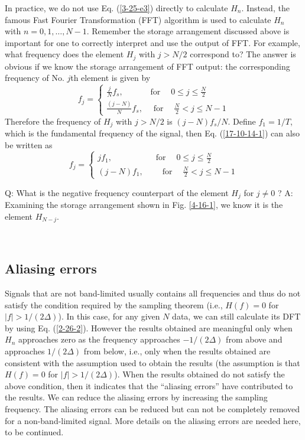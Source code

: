 \documentclass{article}
\newcommand{\tmop}[1]{\ensuremath{\operatorname{#1}}}
\begin{document}
In practice, we do not use Eq. (\ref{3-25-e3}) directly to calculate $H_n$.
Instead, the famous Fast Fourier Transformation (FFT) algorithm is used to
calculate $H_n$ with $n = 0, 1, \ldots, N - 1$. Remember the storage
arrangement discussed above is important for one to correctly interpret and
use the output of FFT. For example, what frequency does the element $H_j$ with
$j > N / 2$ correspond to? The answer is obvious if we know the storage
arrangement of FFT output: the corresponding frequency of No. $j$th element is
given by
\begin{equation}
  \label{17-10-14-1} f_j = \left\{ \begin{array}{l}
    \frac{j}{N} f_s, \hspace{3em} \tmop{for} \quad 0 \leqslant j \leqslant
    \frac{N}{2}\\
    \frac{(j - N)}{N} f_s, \quad \tmop{for} \quad  \frac{N}{2} < j \leqslant N
    - 1
  \end{array} \right.
\end{equation}
Therefore the frequency of $H_j$ with $j > N / 2$ is $(j - N) f_s / N$. Define
$f_1 = 1 / T$, which is the fundamental frequency of the signal, then Eq.
(\ref{17-10-14-1}) can also be written as
\begin{equation}
  f_j = \left\{ \begin{array}{l}
    j f_1, \hspace{5em} \tmop{for} \quad 0 \leqslant j \leqslant \frac{N}{2}\\
    (j - N) f_1, \qquad \tmop{for} \quad  \frac{N}{2} < j \leqslant N - 1
  \end{array} \right.
\end{equation}


Q: What is the negative frequency counterpart of the element $H_j$ for $j \neq
0$ ? A: Examining the storage arrangement shown in Fig. \ref{4-16-1}, we know
it is the element $H_{N - j}$.

\

\subsection{Aliasing errors}

Signals that are not band-limited usually contains all frequencies and thus do
not satisfy the condition required by the sampling theorem (i.e., $H (f) = 0$
for $|f| > 1 / (2 \Delta)$). In this case, for any given $N$ data, we can
still calculate its DFT by using Eq. (\ref{2-26-2}). However the results
obtained are meaningful only when $H_n$ approaches zero as the frequency
approaches $- 1 / (2 \Delta)$ from above and approaches $1 / (2 \Delta)$ from
below, i.e., only when the results obtained are consistent with the assumption
used to obtain the results (the assumption is that $H (f) = 0$ for $|f| > 1 /
(2 \Delta)$). When the results obtained do not satisfy the above condition,
then it indicates that the ``aliasing errors'' have contributed to the
results. We can reduce the aliasing errors by increasing the sampling
frequency. The aliasing errors can be reduced but can not be completely
removed for a non-band-limited signal. More details on the aliasing errors are
needed here, to be continued.
\end{document}
